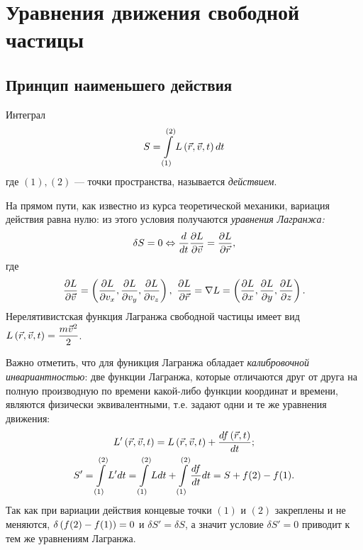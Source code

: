 \newpage
\section{Уравнения движения свободной частицы}
\subsection{Принцип наименьшего действия}
\begin{Def}
    Интеграл
    \[
        S = \int\limits_{(1)}^{(2)} L\left({\vec{r}, \vec{v}, t}\right) dt
    \]
    где $(1), (2)$ --- точки пространства, называется \textit{действием}.
\end{Def}

    На прямом пути, как известно из курса теоретической механики, вариация действия равна нулю: из этого условия
    получаются \textit{уравнения Лагранжа:}
    \[
        \delta S = 0 \Leftrightarrow \frac{d}{dt} \frac{\partial L}{\partial\vec{v}} = \frac{\partial L}{\partial\vec{r}},
    \]
    где
    \[
        \frac{\partial L}{\partial\vec{v}} = \left({\frac{\partial L}{\partial v_x}, \frac{\partial L}{\partial v_y}, \frac{\partial L}{\partial v_z}}\right),
        \ \frac{\partial L}{\partial\vec{r}} = \nabla L = \left({\frac{\partial L}{\partial x}, \frac{\partial L}{\partial y}, \frac{\partial L}{\partial z}}\right).
    \]
    Нерелятивистская функция Лагранжа свободной частицы имеет вид $\displaystyle L\left({\vec{r}, \vec{v}, t}\right) = \frac{m\vec{v}^2}{2}$.

    Важно отметить, что для фуникция Лагранжа обладает \textit{калибровочной инвариантностью}: две функции Лагранжа,
    которые отличаются друг от друга на полную производную по времени какой-либо функции координат и времени, 
    являются физически эквивалентными, т.е. задают одни и те же уравнения движения:
    \begin{gather*}
        L'\left({\vec{r}, \vec{v}, t}\right) = L\left({\vec{r}, \vec{v}, t}\right) + \frac{df\left({\vec{r}, t}\right)}{dt};\\
        S' = \int\limits_{(1)}^{(2)}L'dt = \int\limits_{(1)}^{(2)}Ldt + \int\limits_{(1)}^{(2)}\frac{df}{dt}dt = S + f(2) - f(1).
    \end{gather*}
    Так как при вариации действия концевые точки $(1)$ и $(2)$ закреплены и не меняются, $\delta\left({f(2) - f(1)}\right) = 0$
    и $\delta S' = \delta S$, а значит условие $\delta S' = 0$ приводит к тем же уравнениям Лагранжа.

